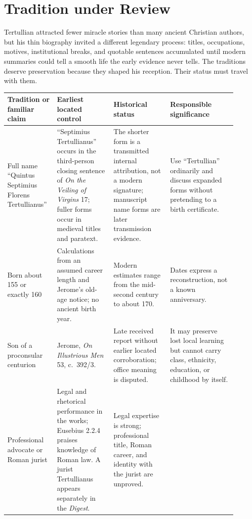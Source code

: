 \section{Tradition under Review}

Tertullian attracted fewer miracle stories than many ancient Christian authors,
but his thin biography invited a different legendary process: titles,
occupations, motives, institutional breaks, and quotable sentences accumulated
until modern summaries could tell a smooth life the early evidence never tells.
The traditions deserve preservation because they shaped his reception. Their
status must travel with them.

\begingroup
\small
\setlength{\tabcolsep}{4pt}
\begin{longtable}{>{\raggedright\arraybackslash}p{0.19\linewidth}
                  >{\raggedright\arraybackslash}p{0.23\linewidth}
                  >{\raggedright\arraybackslash}p{0.23\linewidth}
                  >{\raggedright\arraybackslash}p{0.27\linewidth}}
\toprule
\textbf{Tradition or familiar claim} & \textbf{Earliest located control} &
\textbf{Historical status} & \textbf{Responsible significance}\\
\midrule
\endhead
Full name ``Quintus Septimius Florens Tertullianus'' & ``Septimius
Tertullianus'' occurs in the third-person closing sentence of \emph{On the
Veiling of Virgins} 17; fuller forms occur in medieval titles and paratext. &
The shorter form is a transmitted internal attribution, not a modern signature;
manuscript name forms are later transmission evidence. & Use ``Tertullian''
ordinarily and discuss expanded forms without pretending to a birth
certificate.\\
Born about 155 or exactly 160 & Calculations from an assumed career length and
Jerome's old-age notice; no ancient birth year. & Modern estimates range from
the mid-second century to about 170. & Dates express a reconstruction, not a
known anniversary.\\
Son of a proconsular centurion & Jerome, \emph{On Illustrious Men} 53, c.~392/3.
& Late received report without earlier located corroboration; office meaning is
disputed. & It may preserve lost local learning but cannot carry class,
ethnicity, education, or childhood by itself.\\
Professional advocate or Roman jurist & Legal and rhetorical performance in
the works; Eusebius 2.2.4 praises knowledge of Roman law. A jurist Tertullianus
appears separately in the \emph{Digest}. & Legal expertise is strong;
professional title, Roman career, and identity with the jurist are unproved. &

\end{longtable}
